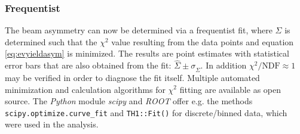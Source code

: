 \subsubsection{Frequentist}
The beam asymmetry can now be determined via a frequentist fit, where $\Sigma$ is determined such that the $\chi^2$ value resulting from the data points and equation \ref{eq:evyieldasym} is minimized. The results are point estimates with statistical error bars that are also obtained from the fit: $\hat{\Sigma}\pm\sigma_{\hat{\Sigma}}$. In addition $\chi^2/\text{NDF}\approx1$ may be verified in order to diagnose the fit itself. Multiple automated minimization and calculation algorithms for $\chi^2$ fitting are available as open source. The \emph{Python} \cite{python} module \emph{scipy} \cite{scipy} and \emph{ROOT} \cite{root} offer e.g. the methods \texttt{scipy.optimize.curve\_fit} \cite{pFit} and \texttt{TH1::Fit()} \cite{rFit} for discrete/binned data, which were used in the analysis.
